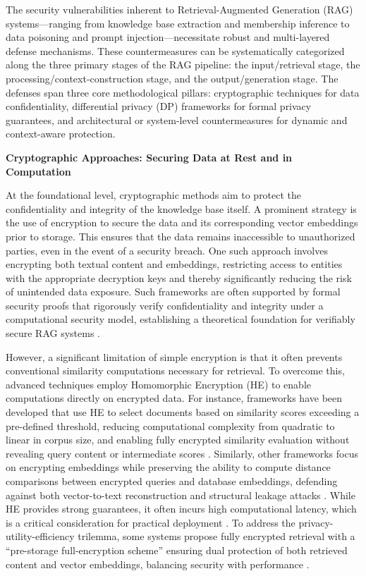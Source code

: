\documentclass[11pt]{article}
\begin{document}
The security vulnerabilities inherent to Retrieval-Augmented Generation (RAG) systems---ranging from knowledge base extraction and membership inference to data poisoning and prompt injection---necessitate robust and multi-layered defense mechanisms. These countermeasures can be systematically categorized along the three primary stages of the RAG pipeline: the input/retrieval stage, the processing/context-construction stage, and the output/generation stage. The defenses span three core methodological pillars: cryptographic techniques for data confidentiality, differential privacy (DP) frameworks for formal privacy guarantees, and architectural or system-level countermeasures for dynamic and context-aware protection.

\textbf{Cryptographic Approaches: Securing Data at Rest and in Computation}

At the foundational level, cryptographic methods aim to protect the confidentiality and integrity of the knowledge base itself. A prominent strategy is the use of encryption to secure the data and its corresponding vector embeddings prior to storage. This ensures that the data remains inaccessible to unauthorized parties, even in the event of a security breach. One such approach involves encrypting both textual content and embeddings, restricting access to entities with the appropriate decryption keys and thereby significantly reducing the risk of unintended data exposure. Such frameworks are often supported by formal security proofs that rigorously verify confidentiality and integrity under a computational security model, establishing a theoretical foundation for verifiably secure RAG systems \cite{ref487}.

However, a significant limitation of simple encryption is that it often prevents conventional similarity computations necessary for retrieval. To overcome this, advanced techniques employ Homomorphic Encryption (HE) to enable computations directly on encrypted data. For instance, frameworks have been developed that use HE to select documents based on similarity scores exceeding a pre-defined threshold, reducing computational complexity from quadratic to linear in corpus size, and enabling fully encrypted similarity evaluation without revealing query content or intermediate scores \cite{ref488}. Similarly, other frameworks focus on encrypting embeddings while preserving the ability to compute distance comparisons between encrypted queries and database embeddings, defending against both vector-to-text reconstruction and structural leakage attacks \cite{ref489}. While HE provides strong guarantees, it often incurs high computational latency, which is a critical consideration for practical deployment \cite{ref488}. To address the privacy-utility-efficiency trilemma, some systems propose fully encrypted retrieval with a ``pre-storage full-encryption scheme'' ensuring dual protection of both retrieved content and vector embeddings, balancing security with performance \cite{ref487}.
\end{document}
